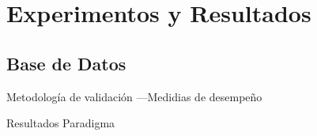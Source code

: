 
\chapter{Experimentos y Resultados}

\ifpdf
    \graphicspath{{Chapter4/Figs/Raster/}{Chapter4/Figs/PDF/}{Chapter4/Figs/}}
\else
    \graphicspath{{Chapter4/Figs/Vector/}{Chapter4/Figs/}}
\fi


\section{Base de Datos} %
\label{section4.1}

Metodología de validación
---Medidias de desempeño

Resultados Paradigma
